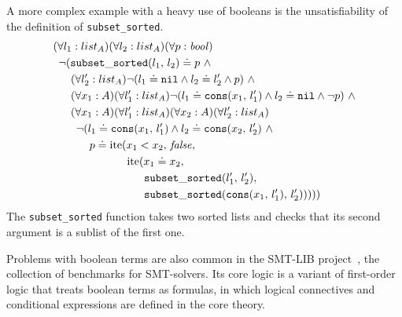 A more complex example with a heavy use of booleans is the unsatisfiability of the definition of \verb'subset_sorted'.
\begin{gather}\label{formula:subset-sorted}
\begin{aligned}
&(\forall{{l_1}:{list_A}})(\forall{{l_2}:{list_A}})(\forall{{p}:{\mathit{bool}}}) \\
&\hspace{0.5em}\neg (\mathtt{subset\_sorted}(l_1,\,l_2) \doteq p ~\wedge \\
&\hspace{1.6em}      (\forall{{l_2'}:{list_A}})\neg (l_1 \doteq \mathtt{nil} \wedge l_2 \doteq l_2' \wedge p) ~\wedge \\
&\hspace{1.6em}      (\forall{{x_1}:{A}})(\forall{{l_1'}:{list_A}})\neg (l_1 \doteq \mathtt{cons}(x_1,\,l_1') \wedge l_2 \doteq \mathtt{nil} \wedge \neg p) ~\wedge \\
&\hspace{1.6em}      (\forall{{x_1}:{A}})(\forall{{l_1'}:{list_A}})(\forall{{x_2}:{A}})(\forall{{l_2'}:{list_A}}) \\
&\hspace{2.1em}       \neg (l_1 \doteq \mathtt{cons}(x_1,\,l_1') \wedge l_2 \doteq \mathtt{cons}(x_2,\,l_2') ~\wedge \\
&\hspace{3.3em}       p \doteq \mathrm{ite}(x_1 < x_2,\,\mathit{false},\\
&\hspace{6.7em}                             \mathrm{ite}(x_1 \doteq x_2,\\
&\hspace{8.25em}                                        \mathtt{subset\_sorted}(l_1',\,l_2'), \\
&\hspace{8.25em}                                        \mathtt{subset\_sorted}(\mathtt{cons}(x_1,\,l_1'),\,l_2')))))
\end{aligned}
\end{gather}
The \verb'subset_sorted' function takes two sorted lists and checks that its second argument is a sublist of the first one.

Problems with boolean terms are also common in the SMT-LIB project~\cite{SMT-LIB}, the collection of benchmarks for SMT-solvers. Its core logic is a variant of first-order logic that treats boolean terms as formulas, in which logical connectives and conditional expressions are defined in the core theory.

